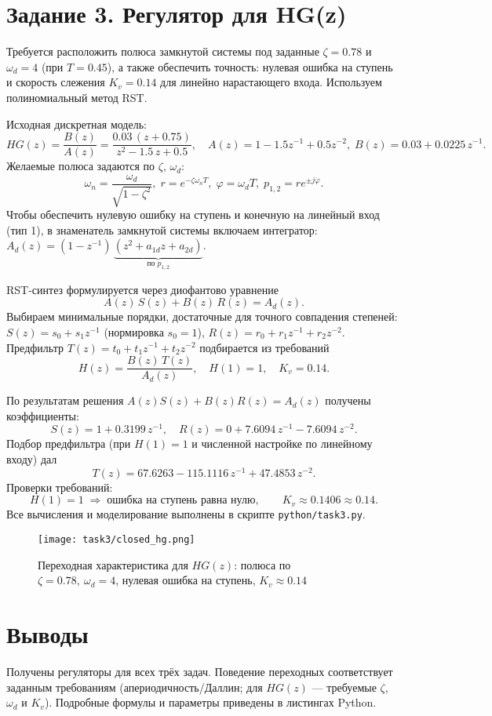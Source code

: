 \section{Задание 3. Регулятор для HG(z)}
Требуется расположить полюса замкнутой системы под заданные $\zeta=0.78$ и $\omega_d=4$ (при $T=0.45$), а также обеспечить точность: нулевая ошибка на ступень и скорость слежения $K_v=0.14$ для линейно нарастающего входа. Используем полиномиальный метод RST.

Исходная дискретная модель:
\[
HG(z) = \frac{B(z)}{A(z)} = \frac{0.03\,(z+0.75)}{z^2 - 1.5\,z + 0.5},\quad
A(z)=1-1.5z^{-1}+0.5z^{-2},\; B(z)=0.03+0.0225\,z^{-1}.
\]
Желаемые полюса задаются по $\zeta,\,\omega_d$:
\[\omega_n = \frac{\omega_d}{\sqrt{1-\zeta^2}},\; r=e^{-\zeta\omega_n T},\; \varphi = \omega_d T,\; p_{1,2}=r e^{\pm j\varphi}.
\]
Чтобы обеспечить нулевую ошибку на ступень и конечную на линейный вход (тип 1), в знаменатель замкнутой системы включаем интегратор: \(A_d(z)=(1-z^{-1})\,\underbrace{(z^2 + a_{1d} z + a_{2d})}_{\text{по }p_{1,2}}\).

RST-синтез формулируется через диофантово уравнение
\[ A(z)\,S(z) + B(z)\,R(z) = A_d(z). \]
Выбираем минимальные порядки, достаточные для точного совпадения степеней: \(S(z)=s_0+s_1 z^{-1}\) (нормировка $s_0=1$), \(R(z)=r_0+r_1 z^{-1}+r_2 z^{-2}\). Предфильтр \(T(z)=t_0+t_1 z^{-1}+t_2 z^{-2}\) подбирается из требований
\[ H(z)=\frac{B(z)\,T(z)}{A_d(z)},\quad H(1)=1,\quad K_v=0.14. \]

По результатам решения \(A(z)S(z)+B(z)R(z)=A_d(z)\) получены коэффициенты:
\[ S(z)=1 + 0.3199\,z^{-1},\quad R(z)=0 + 7.6094\,z^{-1} - 7.6094\,z^{-2}. \]
Подбор предфильтра (при $H(1)=1$ и численной настройке по линейному входу) дал
\[ T(z)=67.6263 - 115.1116\,z^{-1} + 47.4853\,z^{-2}. \]
Проверки требований:
\[ H(1)=1\;\Rightarrow\; \text{ошибка на ступень равна нулю},\qquad K_v\approx 0.1406 \approx 0.14. \]
Все вычисления и моделирование выполнены в скрипте \texttt{python/task3.py}.

\begin{figure}[H]
    \centering
    \texttt{[image: task3/closed\_hg.png]}
    \caption{Переходная характеристика для $HG(z)$: полюса по $\zeta=0.78,\ \omega_d=4$, нулевая ошибка на ступень, $K_v\approx0.14$}
\end{figure}

\section{Выводы}
Получены регуляторы для всех трёх задач. Поведение переходных соответствует заданным требованиям (апериодичность/Даллин; для $HG(z)$ — требуемые $\zeta$, $\omega_d$ и $K_v$). Подробные формулы и параметры приведены в листингах Python.


